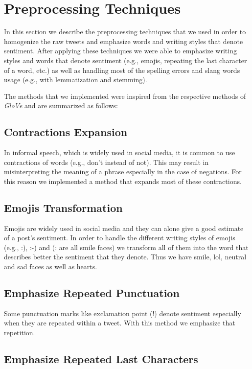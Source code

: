 \section{Preprocessing Techniques}
\label{sec:preprocessing}
In this section we describe the preprocessing techniques that we used in order to homogenize the raw tweets and emphasize words and writing styles that denote sentiment.
After applying these techniques we were able to emphasize writing styles and words that denote sentiment (e.g., emojis, repeating the last character of a word, etc.)
as well as handling most of the spelling errors and slang words usage (e.g., with lemmatization and stemming).

The methods that we implemented were inspired from the respective methods of \textit{GloVe} \cite{pennington2014glove} and are summarized as follows:

\subsection{Contractions Expansion}
In informal speech, which is widely used in social media, it is common to use contractions of words (e.g., don't instead of not).
This may result in misinterpreting the meaning of a phrase especially in the case of negations.
For this reason we implemented a method that expands most of these contractions.

\subsection{Emojis Transformation}
Emojis are widely used in social media and they can alone give a good estimate of a post's sentiment.
In order to handle the different writing styles of emojis (e.g., :), :-) and (: are all smile faces) we transform all of them into the word that describes better the sentiment that they denote.
Thus we have smile, lol, neutral and sad faces as well as hearts.

\subsection{Emphasize Repeated Punctuation}

Some punctuation marks like exclamation point (!) denote sentiment especially when they are repeated within a tweet. With this method we emphasize that repetition.

\subsection{Emphasize Repeated Last Characters}

